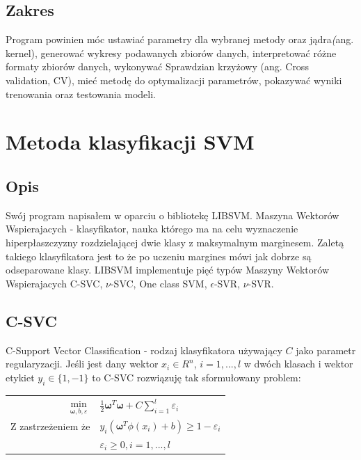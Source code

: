 \documentclass[paper=a4, fontsize=11pt]{scrartcl} %
\numberwithin{equation}{section} %
\numberwithin{figure}{section} %
\begin{document}
\subsection{Zakres}
    Program powinien móc ustawiać parametry dla wybranej metody oraz jądra\textit(ang. kernel), 
    generować wykresy podawanych zbiorów danych, interpretować różne formaty zbiorów danych, 
    wykonywać Sprawdzian krzyżowy (ang. Cross validation, CV), mieć metodę do optymalizacji 
    parametrów, pokazywać wyniki trenowania oraz testowania modeli.
\newpage

\section{Metoda klasyfikacji SVM} %
\subsection{Opis}
    \par Swój program napisałem w oparciu o bibliotekę LIBSVM\cite{CC01a}. Maszyna Wektorów
    Wspierajacych - klasyfikator, nauka którego ma na celu wyznaczenie hiperpłaszczyzny
    rozdzielającej dwie klasy z maksymalnym marginesem.  Zaletą takiego klasyfikatora jest to
    że po uczeniu margines mówi jak dobrze są odseparowane klasy. LIBSVM implementuje pięć
    typów Maszyny Wektorów Wspierajacych C-SVC, $\nu$-SVC, One class SVM, $\epsilon$-SVR,
    $\nu$-SVR.
\subsection{C-SVC}
    \par C-Support Vector Classification - rodzaj klasyfikatora używający $C$ jako 
    parametr regularyzacji. Jeśli jest dany wektor $x_i \in R^n$, $i=1,...,l$ 
    w dwóch klasach i wektor etykiet $y_i \in \{1, -1\}$ to C-SVC rozwiązuję tak
    sformułowany problem:

    \begin{center}
        \begin{tabular}{rl}
            $\min\limits_{\pmb{\omega}, b, \varepsilon}$ & $\frac{1}{2} \pmb{\omega} ^T \pmb{\omega} +
            C \sum\limits_{i=1}^{l}\varepsilon_i$ \\
            Z zastrzeżeniem że & $y_i(\pmb{\omega}^T\phi(x_i) + b) \geq 1 - \varepsilon_i$ \\
                               & $\varepsilon_i \geq 0,i=1,...,l$
        \end{tabular}
    \end{center}
\end{document}
